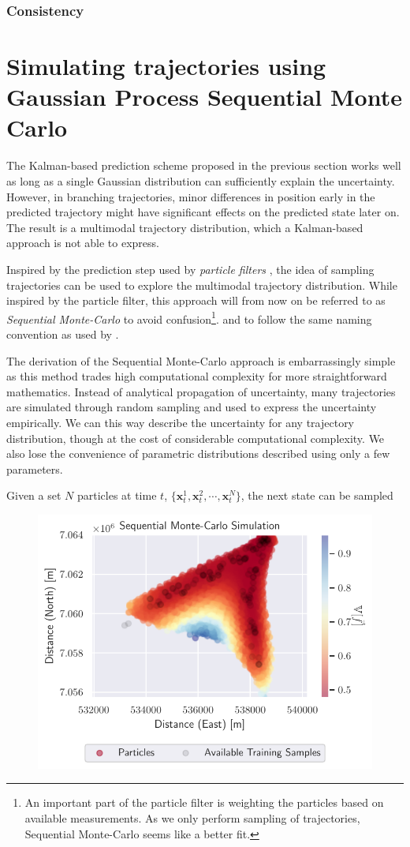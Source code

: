 \subsubsection{Consistency}


\section{Simulating trajectories using Gaussian Process Sequential Monte Carlo}
The Kalman-based prediction scheme proposed in the previous section works well as long as a single Gaussian distribution can sufficiently explain the uncertainty. However, in branching trajectories, minor differences in position early in the predicted trajectory might have significant effects on the predicted state later on. The result is a multimodal trajectory distribution, which a Kalman-based approach is not able to express.

Inspired by the prediction step used by \textit{particle filters} \cite{sensorfusjon}, the idea of sampling trajectories can be used to explore the multimodal trajectory distribution. While inspired by the particle filter, this approach will from now on be referred to as \textit{Sequential Monte-Carlo} to avoid confusion\footnote{An important part of the particle filter is weighting the particles based on available measurements. As we only perform sampling of trajectories, Sequential Monte-Carlo seems like a better fit.}. and to follow the same naming convention as used by \cite{pedestrian}.

The derivation of the Sequential Monte-Carlo approach is embarrassingly simple as this method trades high computational complexity for more straightforward mathematics. Instead of analytical propagation of uncertainty, many trajectories are simulated through random sampling and used to express the uncertainty empirically. We can this way describe the uncertainty for any trajectory distribution, though at the cost of considerable computational complexity. We also lose the convenience of parametric distributions described using only a few parameters.

Given a set $N$ particles at time $t$, $\{\boldsymbol{x}^1_t, \boldsymbol{x}^2_t, \cdots, \boldsymbol{x}^N_t\}$, the next state can be sampled 

\begin{figure}
    \centering
    \includegraphics[width=\textwidth]{figures/dyngp/gp_particle.pdf}
    \caption{}
    \label{fig:gp_particle}
\end{figure}



